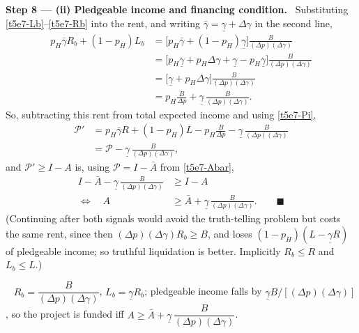 \documentclass[11pt,a4paper]{article}
\newcommand{\step}[2]{\par\medskip\noindent\textbf{Step #1 --- #2.}~}
\newcommand{\answer}[1]{\par\smallskip\noindent\fbox{\textbf{Answer #1.}}~}
\begin{document}
\step{8}{(ii) Pledgeable income and financing condition} Substituting \eqref{t5e7-Lb}--\eqref{t5e7-Rb}
into the rent, and writing $\bar\gamma=\underline\gamma+\Delta\gamma$ in the second line,
\begin{align}
  p_H\bar\gamma R_b+(1-p_H)L_b &= \bigl[p_H\bar\gamma+(1-p_H)\underline\gamma\bigr]\frac{B}{(\Delta p)(\Delta\gamma)} \nonumber\\
  &= \bigl[p_H\underline\gamma+p_H\Delta\gamma+\underline\gamma-p_H\underline\gamma\bigr]\frac{B}{(\Delta p)(\Delta\gamma)} \nonumber\\
  &= \bigl[\underline\gamma+p_H\Delta\gamma\bigr]\frac{B}{(\Delta p)(\Delta\gamma)} \nonumber\\
  &= p_H\frac{B}{\Delta p}+\underline\gamma\,\frac{B}{(\Delta p)(\Delta\gamma)}. \label{t5e7-rent}
\end{align}
So, subtracting this rent from total expected income and using \eqref{t5e7-Pi},
\begin{align}
  \mathcal P' &= p_H\bar\gamma R+(1-p_H)L-p_H\frac{B}{\Delta p}-\underline\gamma\,\frac{B}{(\Delta p)(\Delta\gamma)} \nonumber\\
  &= \mathcal P-\underline\gamma\,\frac{B}{(\Delta p)(\Delta\gamma)}, \label{t5e7-Pii}
\end{align}
and $\mathcal P'\geq I-A$ is, using $\mathcal P=I-\bar A$ from \eqref{t5e7-Abar},
\begin{align}
  I-\bar A-\underline\gamma\,\frac{B}{(\Delta p)(\Delta\gamma)} &\geq I-A \nonumber\\
  \Longleftrightarrow\quad A &\geq \bar A+\underline\gamma\,\frac{B}{(\Delta p)(\Delta\gamma)}. \qquad\blacksquare \label{t5e7-Aii}
\end{align}
(Continuing after both signals would avoid the truth-telling problem but costs the same rent,
since then $(\Delta p)(\Delta\gamma)R_b\geq B$, and loses $(1-p_H)(L-\underline\gamma R)$ of pledgeable income;
so truthful liquidation is better. Implicitly $R_b\leq R$ and $L_b\leq L$.)

\answer{(ii)} $R_b=\dfrac{B}{(\Delta p)(\Delta\gamma)}$, $L_b=\underline\gamma R_b$; pledgeable income falls
by $\underline\gamma B/[(\Delta p)(\Delta\gamma)]$, so the project is funded iff
$A\ge\bar A+\underline\gamma\,\dfrac{B}{(\Delta p)(\Delta\gamma)}$.
\end{document}
